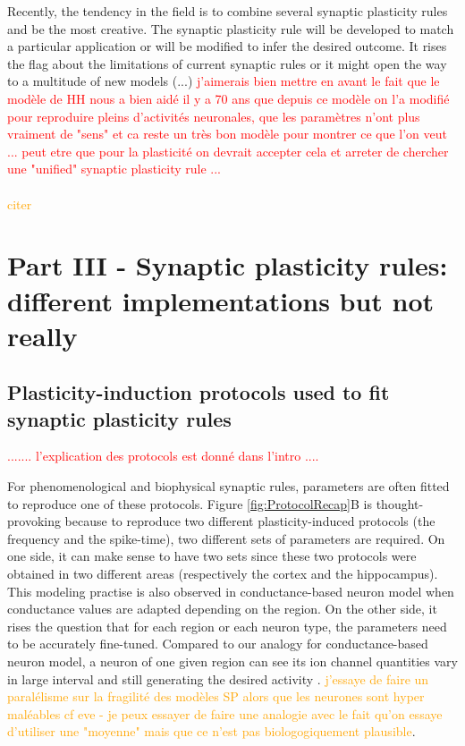 Recently, the tendency in the field is to combine several synaptic plasticity rules and be the most creative. The synaptic plasticity rule will be developed to match a particular application or will be modified to infer the desired outcome. It rises the flag about the limitations of current synaptic rules or it might open the way to a multitude of new models (...) \textcolor{red}{j'aimerais bien mettre en avant le fait que le modèle de HH nous a bien aidé il y a 70 ans que depuis ce modèle on l'a modifié pour reproduire pleins d'activités neuronales, que les paramètres n'ont plus vraiment de "sens" et ca reste un très bon modèle pour montrer ce que l'on veut ... peut etre que pour la plasticité on devrait accepter cela et arreter de chercher une "unified" synaptic plasticity rule ... }\\
~\\
\textcolor{orange}{citer \cite{artola_long-term_1993} }



%
%
\section{Part III - Synaptic plasticity rules: different implementations but not really}

\subsection{Plasticity-induction protocols used to fit synaptic plasticity rules}
\textcolor{red}{....... l'explication des protocols est donné dans l'intro ....}

For phenomenological and biophysical synaptic rules, parameters are often fitted to reproduce one of these protocols. Figure \ref{fig:ProtocolRecap}B is thought-provoking because to reproduce two different plasticity-induced protocols (the frequency and the spike-time), two different sets of parameters are required. On one side, it can make sense to have two sets since these two protocols were obtained in two different areas (respectively the cortex and the hippocampus). This modeling practise is also observed in conductance-based neuron model when conductance values are adapted depending on the region. On the other side, it rises the question that for each region or each neuron type, the parameters need to be accurately fine-tuned. Compared to our analogy for conductance-based neuron model, a neuron of one given region can see its ion channel quantities vary in large interval and still generating the desired activity \citep{prinz_similar_2004}. 
\textcolor{orange}{j'essaye de faire un paralélisme sur la fragilité des modèles SP alors que les neurones sont hyper maléables cf  eve - je peux essayer de faire une analogie avec le fait qu'on essaye d'utiliser une "moyenne" mais que ce n'est pas biologogiquement plausible}.

